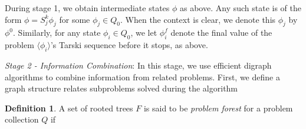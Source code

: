 \documentclass[11pt,reqno]{amsart}
\theoremstyle{definition}
\newtheorem{defn}[thm]{Definition}
\numberwithin{equation}{section}
\newcommand{\lag}{\langle}
\newcommand{\rag}{\rangle}
\newcommand{\pre}{\phi}
\newcommand{\acto}{Q_0}
\newcommand{\act}{Q}
\newcommand{\preo}{\pre^{0}}
\newcommand{\pref}{\pre^{f}}
\newcommand{\forest}{F}
\begin{document}
During stage 1, we obtain intermediate states $\pre$ as above.
Any such state is of the form $\pre = S_j^k \pre_j$ for some $\pre_j \in \acto$.
When the context is clear, we denote this $\pre_j$ by $\preo$. 
Similarly, for any state $\pre_i \in \acto$, we let $\pref_i$ denote the final value of the problem $\lag \pre_i \rag$'s Tarski sequence before it stops, as above. 

\emph{Stage 2 - Information Combination}: In this stage, we use efficient digraph algorithms to combine information from related problems.
First, we define a graph structure relates subproblems solved during the algorithm
\begin{defn}
A set of rooted trees $\forest$ is said to be \emph{problem forest} for a problem collection $\act$ if
\end{defn}
\end{document}
